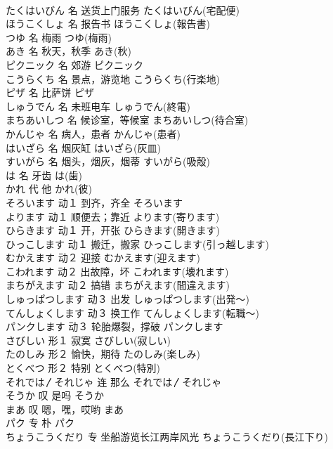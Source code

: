 \documentclass[8pt]{extreport}
\begin{document}
\begin{CJK}{UTF8}{min}
\\	たくはいびん	名	送货上门服务	たくはいびん(宅配便)	
\\	ほうこくしょ	名	报告书	ほうこくしょ(報告書)	
\\	つゆ	名	梅雨	つゆ(梅雨)	
\\	あき	名	秋天，秋季	あき(秋)	
\\	ピクニック	名	郊游	ピクニック	
\\	こうらくち	名	景点，游览地	こうらくち(行楽地)	
\\	ピザ	名	比萨饼	ピザ	
\\	しゅうでん	名	未班电车	しゅうでん(終電)	
\\	まちあいしつ	名	候诊室，等候室	まちあいしつ(待合室)	
\\	かんじゃ	名	病人，患者	かんじゃ(患者)	
\\	はいざら	名	烟灰缸	はいざら(灰皿)	
\\	すいがら	名	烟头，烟灰，烟蒂	すいがら(吸殻)	
\\	は	名	牙齿	は(歯)	
\\	かれ	代	他	かれ(彼)	
\\	そろいます	动１	到齐，齐全	そろいます	
\\	よります	动１	顺便去；靠近	よります(寄ります)	
\\	ひらきます	动１	开，开张	ひらきます(開きます)	
\\	ひっこします	动１	搬迁，搬家	ひっこします(引っ越します)	
\\	むかえます	动２	迎接	むかえます(迎えます)	
\\	こわれます	动２	出故障，坏	こわれます(壊れます)	
\\	まちがえます	动２	搞错	まちがえます(間違えます)	
\\	しゅっぱつします	动３	出发	しゅっぱつします(出発～)	
\\	てんしょくします	动３	换工作	てんしょくします(転職～)	
\\	パンクします	动３	轮胎爆裂，撑破	パンクします	
\\	さびしい	形１	寂寞	さびしい(寂しい)	
\\	たのしみ	形２	愉快，期待	たのしみ(楽しみ)	
\\	とくべつ	形２	特别	とくべつ(特別)	
\\	それでは〳それじゃ	连	那么	それでは〳それじゃ	
\\	そうか	叹	是吗	そうか	
\\	まあ	叹	嗯，嘿，哎哟	まあ	
\\	パク	专	朴	パク	
\\	ちょうこうくだり	专	坐船游览长江两岸风光	ちょうこうくだり(長江下り)	

\end{CJK}
\end{document}
